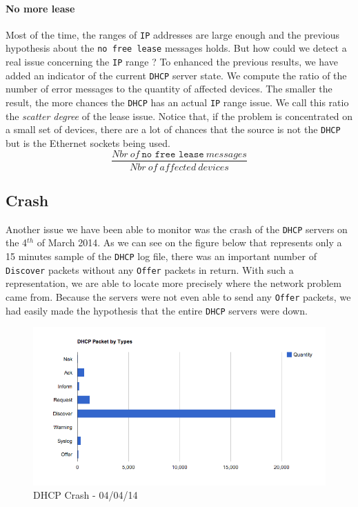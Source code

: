 \paragraph*{No more lease} Most of the time, the ranges of \texttt{IP} addresses are large enough and the previous hypothesis about the \texttt{no free lease} messages holds. But how could we detect a real issue concerning the \texttt{IP} range ? To enhanced the previous results, we have added an indicator of the current \texttt{DHCP} server state. We compute the ratio of the number of error messages to the quantity of affected devices. The smaller the result, the more chances the \texttt{DHCP} has an actual \texttt{IP} range issue. We call this ratio the \emph{scatter degree} of the lease issue. Notice that, if the problem is concentrated on a small set of devices, there are a lot of chances that the source is not the \texttt{DHCP} but is the Ethernet sockets being used.
\[ \frac{Nbr\ of\ \texttt{no free lease}\ messages}{Nbr\ of\ affected\ devices} \] 


\subsection{Crash}
Another issue we have been able to monitor was the crash of the \texttt{DHCP} servers on the 4$^{th}$ of March 2014. As we can see on the figure below that represents only a 15 minutes sample of the \texttt{DHCP} log file, there was an important number of \texttt{Discover} packets without any \texttt{Offer} packets in return. With such a representation, we are able to locate more precisely where the network problem came from. Because the servers were not even able to send any \texttt{Offer} packets, we had easily made the hypothesis that the entire \texttt{DHCP} servers were down.

\begin{figure}[H]
	\centering
   \includegraphics[width=1\textwidth]{Pictures/chapter5/dhcpCrash.png}
   \caption{DHCP Crash - 04/04/14}
\end{figure}

